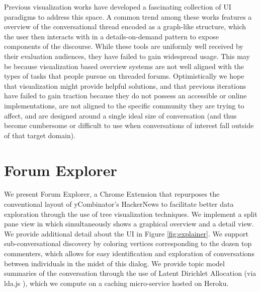 \documentclass{egpubl}
\begin{document}
%
Previous visualization works have developed a fascinating collection of UI paradigms to address this space. 
%
A common trend among these works features a overview of the conversational thread encoded as a graph-like structure, which the user then interacts with in a details-on-demand \cite{shneiderman1996eyes} pattern to expose components of the discourse. 
%
While these tools are uniformly well received by their evaluation audiences, they have failed to gain widespread usage.
%
This may be because visualization based overview systems are not well aligned with the types of tasks that people pursue on threaded forums.
%
Optimistically we hope that visualization might provide helpful solutions, and that previous iterations have failed to gain traction because they do not possess an accessible or online implementations, are not aligned to the specific community they are trying to affect, and are designed around a single ideal size of conversation (and thus become cumbersome or difficult to use when conversations of interest fall outside of that target domain). 







\section{Forum Explorer}

We present Forum Explorer, a Chrome Extension that repurposes the conventional layout of yCombinator's HackerNews \cite{hackernews} to facilitate better data exploration through the use of tree visualization techniques.
%
We implement a split pane view in which simultaneously shows a graphical overview and a detail view. 
%
We provide additional detail about the UI in Figure \ref{fig:explainer}. 
%
We support sub-conversational discovery by coloring vertices corresponding to the dozen top commenters, which allows for easy identification and exploration of conversations between individuals in the midst of this dialog.
%
%
We provide topic model summaries of the conversation through the use of Latent Dirichlet Allocation (via lda.js \cite{lda-js}), which we compute on a caching micro-service hosted on Heroku. 
%
\end{document}
